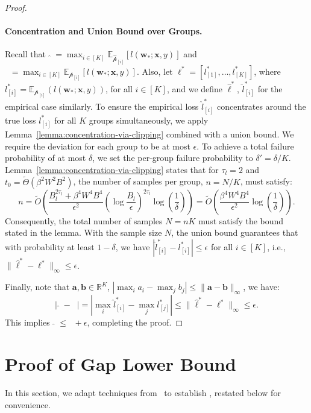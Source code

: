 \documentclass[11pt]{article}
\numberwithin{thm}{section}
\theoremstyle{plain}
\theoremstyle{definition}
\theoremstyle{remark} \newtheorem{remark}[thm]{Remark}
\def\vl{{\bm{\ell}}}
\def\vw{{\bm{w}}}
\def\vx{{\bm{x}}}
\def\ep{\widehat{\mathcal{p}}}
\def\pp{{\mathcal{p}}}
\newcommand{\E}{\mathbb{E}}
\newcommand{\R}{\mathbb{R}}
\newcommand{\ppi}{{\pp_{[i]}}}
\newcommand{\epi}{\ep_{[i]}}
\DeclareMathOperator{\mOPT}{OPT_m}
\newcommand{\mOPThat}{\widehat{\mOPT}}
\def\mathbf{\bm}
\begin{document}
\begin{proof}
\paragraph{Concentration and Union Bound over Groups.}
Recall that $\mOPThat = \max_{i\in[K]} \E_{\epi}[l(\vw_*;\vx,y)]$ and 
$\mOPT = \max_{i\in[K]} \E_{\ppi}[l(\vw_*;\vx,y)]$.
Also, let \(\vl^{*}=[l^{*}_{[1]},\dots,l^{*}_{[K]}]\), where \(l^{*}_{[i]}=\E_{\ppi}(l(\vw_*;\vx,y))\), for all \(i\in [K]\), and we define \(\hat{\vl}^{*}\), $\hat{l}^*_{[i]}$ for the empirical case similarly. To ensure the empirical loss $\hat{l}^*_{[i]}$ concentrates around the true loss $l^*_{[i]}$ for all $K$ groups simultaneously, we apply Lemma~\ref{lemma:concentration-via-clipping} combined with a union bound. 
We require the deviation for each group to be at most $\epsilon$. 
To achieve a total failure probability of at most $\delta$, 
we set the per-group failure probability to $\delta' = \delta/K$. 
Lemma~\ref{lemma:concentration-via-clipping} states that for $\tau_l=2$ and $t_0 = \tilde{\Theta}(\beta^2 W^2B^2)$, 
the number of samples per group, $n=N/K$, must satisfy:
\[
n = \tilde{O}\left( \frac{ B_l^{2\tau_l}+ \beta^4 W^4B^4}{\epsilon^2}\left(\log\frac{B_l}{\epsilon}\right)^{2\tau_l} \log\left(\frac 1 \delta \right)\right) 
= \tilde{O}\left( \frac{\beta^4 W^4 B^4}{\epsilon^2} \log \left( \frac 1 \delta \right) \right).
\]
Consequently, the total number of samples $N=nK$ must satisfy the bound stated in the lemma. With the sample size \(N\), the union bound guarantees that with probability at least $1-\delta$, 
we have $|\hat{l}^*_{[i]} - l^*_{[i]}| \le \epsilon$ for all $i \in [K]$, i.e.,  $\|\hat{\vl}^* - \vl^*\|_\infty \le \epsilon$.

Finally, note that $\mathbf{a}, \mathbf{b} \in \R^K$, $|\max_i a_i - \max_j b_j| \le \|\mathbf{a} - \mathbf{b}\|_\infty$, we have:
\[
|\mOPThat - \mOPT| = |\max_i \hat{l}^*_{[i]} - \max_j l^*_{[j
]}| \le \|\hat{\vl}^* - \vl^*\|_\infty \le \epsilon.
\]
This implies $\mOPThat \le \mOPT + \epsilon$, completing the proof.
\end{proof}


\section{Proof of Gap Lower Bound}\label{app:gap-lower-bound}
In this section, we adapt techniques from~\citep{Li2024shifts} to establish , restated below for convenience.
\end{document}
